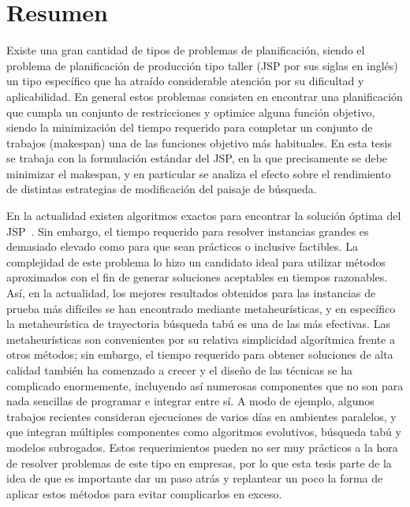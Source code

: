 \chapter*{Resumen}
Existe una gran cantidad de tipos de problemas de planificación, siendo el problema de planificación de producción tipo taller
(JSP por sus siglas en inglés) un tipo específico que ha atraído considerable atención por su dificultad y aplicabilidad. 
%
En general estos problemas consisten en encontrar una planificación que cumpla un conjunto de restricciones y optimice alguna función
objetivo, siendo la minimización del tiempo requerido para completar un conjunto de trabajos (makespan) una de las funciones objetivo más habituales.
%
En esta tesis se trabaja con la formulación estándar del JSP, en la que precisamente se debe minimizar el makespan, y en particular se analiza 
el efecto sobre el rendimiento de distintas estrategias de modificación del paisaje de búsqueda.

En la actualidad existen algoritmos exactos para encontrar la solución óptima del JSP~\cite{Brucker1994}.
%
Sin embargo, el tiempo requerido para resolver instancias grandes es demasiado elevado como para que sean prácticos o inclusive factibles.
%
La complejidad de este problema lo hizo un candidato ideal para utilizar métodos aproximados con el fin de generar soluciones aceptables 
en tiempos razonables. 
%
Así, en la actualidad, los mejores resultados obtenidos para las instancias de prueba más difíciles se han encontrado mediante metaheurísticas, y
en específico la metaheurística de trayectoria búsqueda tabú es una de las más efectivas.
%
Las metaheurísticas son convenientes por su relativa simplicidad algorítmica frente a otros métodos; sin embargo, el tiempo requerido para obtener 
soluciones de alta calidad también ha comenzado a crecer y el diseño de las técnicas se ha complicado enormemente, incluyendo así numerosas
componentes que no son para nada sencillas de programar e integrar entre sí.
%
A modo de ejemplo, algunos trabajos recientes consideran ejecuciones de varios días en ambientes paralelos, y que integran múltiples componentes
como algoritmos evolutivos, búsqueda tabú y modelos subrogados.
%
Estos requerimientos pueden no ser muy prácticos a la hora de resolver problemas de este tipo en empresas, por lo que esta tesis parte de la
idea de que es importante dar un paso atrás y replantear un poco la forma de aplicar estos métodos para evitar complicarlos en exceso.

